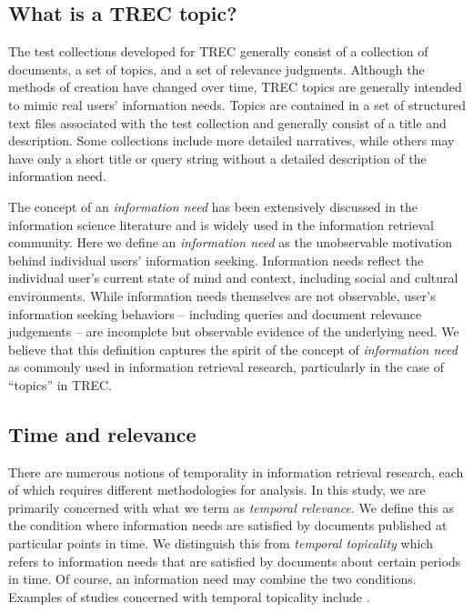 \documentclass[runningheads,a4paper]{llncs}
\begin{document}
\subsection{What is a TREC topic?}
The test collections developed for TREC generally consist of a collection of documents, a set of topics, and a set of relevance judgments. Although the methods of creation have changed over time, TREC topics are generally intended to mimic real users' information needs. Topics are contained in a set of structured text files associated with the test collection and generally consist of a title and description. Some collections include more detailed narratives, while others may have only a short title or query string without a detailed description of the information need.

The concept of  an \emph{information need} has been extensively discussed in the information science literature and is widely used in the information retrieval community. Here we define an \emph{information need} as the unobservable motivation behind individual users' information seeking. Information needs reflect the individual user's current state of mind and context, including social and cultural environments. While information needs themselves are not observable, user's information seeking behaviors -- including queries and document relevance judgements -- are incomplete but observable evidence of the underlying need.  We believe that this definition captures the spirit of the concept of \emph{information need} as commonly used in information retrieval research, particularly in the case of ``topics'' in TREC.

\subsection{Time and relevance}

There are numerous notions of temporality in information retrieval research, each of which requires different methodologies for analysis. In this study, we are primarily concerned with what we term as \emph{temporal relevance}. We define this as the condition where information needs are satisfied by documents published at particular points in time. We distinguish this from \emph{temporal topicality} which refers to information needs that are satisfied by documents about certain periods in time. Of course, an information need may combine the two conditions. Examples of studies concerned with temporal topicality include \cite{Berberich2010,Kanhabua2011}.
\end{document}
